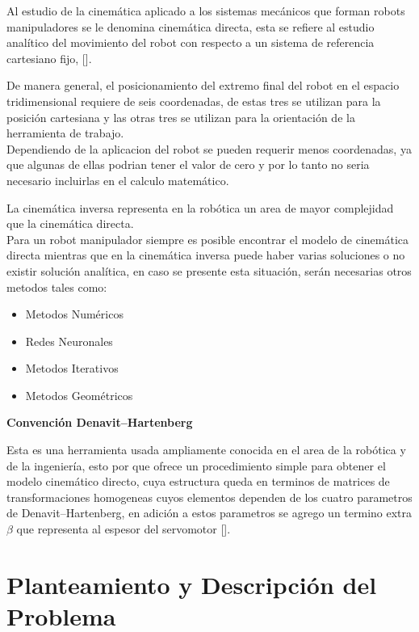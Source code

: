 \documentclass[12pt]{article}
\begin{document}
Al estudio de la cinemática aplicado a los sistemas mecánicos que forman robots manipuladores se le denomina cinemática directa, esta se refiere al estudio analítico del movimiento del robot con respecto a un sistema de referencia cartesiano fijo, [\cite{reyes2011robotica}].
\vspace{6mm}

De manera general, el posicionamiento del extremo final del robot en el espacio tridimensional requiere de seis coordenadas, de estas tres se utilizan para la posición cartesiana y las otras tres se utilizan para la orientación de la herramienta de trabajo.
\\
Dependiendo de la aplicacion del robot se pueden requerir menos coordenadas, ya que algunas de ellas podrian tener el valor de cero y por lo tanto no seria necesario incluirlas en el calculo matemático.
\vspace{6mm}

La cinemática inversa representa en la robótica un area de mayor complejidad que la cinemática directa.
\\
Para un robot manipulador siempre es posible encontrar el modelo de cinemática directa mientras que en la cinemática inversa puede haber varias soluciones o no existir solución analítica, en caso se presente esta situación, serán necesarias otros metodos tales como:
\begin{itemize}
    \item Metodos Numéricos
    \item Redes Neuronales 
    \item Metodos Iterativos 
    \item Metodos Geométricos
\end{itemize}

\textbf{Convención Denavit–Hartenberg}
\vspace{6mm}

Esta es una herramienta usada ampliamente conocida en el area de la robótica y de la ingeniería, esto por que ofrece un procedimiento simple para obtener el modelo cinemático directo, cuya estructura queda en terminos de matrices de transformaciones homogeneas cuyos elementos dependen de los cuatro parametros de Denavit–Hartenberg, en adición a estos parametros se agrego un termino extra $\beta$ que representa al espesor del servomotor [\cite{reyes2011robotica}].

\section{Planteamiento y Descripción del Problema}
\end{document}
